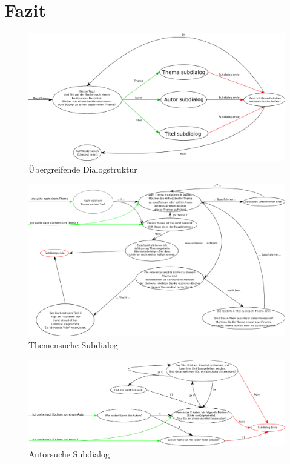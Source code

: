 \documentclass[12pt,a4paper]{article}
\begin{document}
\section{Fazit}

\begin{figure}[ht]
    \centering
    \includegraphics[width=\textwidth]{dialog_main.png}
    \caption{Übergreifende Dialogstruktur}
    \label{fig:main_dialog}
\end{figure}

\begin{figure}[ht]
    \centering
    \includegraphics[width=\textwidth]{subdialog_theme.png}
    \caption{Themensuche Subdialog}
    \label{fig:category_subdialog}
\end{figure}

\begin{figure}[ht]
    \centering
    \includegraphics[width=\textwidth]{subdialog_author.png}
    \caption{Autorsuche Subdialog}
    \label{fig:author_subdialog}
\end{figure}
\end{document}
